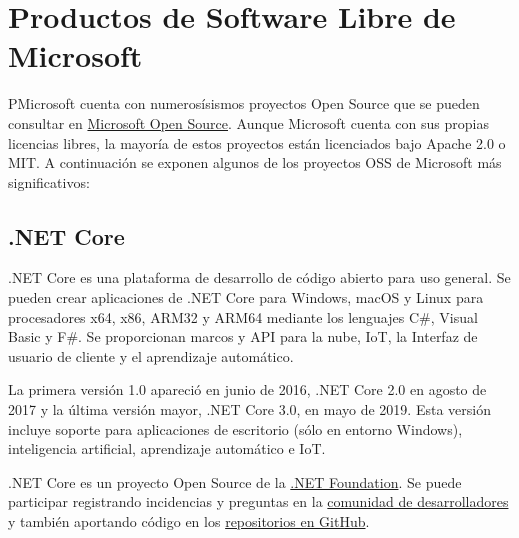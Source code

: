\section{Productos de Software Libre de Microsoft}PMicrosoft cuenta con numerosísismos proyectos Open Source que se pueden consultar en \href{https://opensource.microsoft.com}{Microsoft Open Source}. Aunque Microsoft cuenta con sus propias licencias libres, la mayoría de estos proyectos están licenciados bajo Apache 2.0 o MIT. A continuación se exponen algunos de los proyectos OSS de Microsoft más significativos:

\subsection{.NET Core}
.NET Core es una plataforma de desarrollo de código abierto para uso general. Se pueden crear aplicaciones de .NET Core para Windows, macOS y Linux para procesadores x64, x86, ARM32 y ARM64 mediante los lenguajes C\#, Visual Basic y F\#. Se proporcionan marcos y API para la nube, IoT, la Interfaz de usuario de cliente y el aprendizaje automático.

La primera versión 1.0 apareció en junio de 2016, .NET Core 2.0 en agosto de 2017 y la última versión mayor, .NET Core 3.0, en mayo de 2019. Esta versión incluye soporte para aplicaciones de escritorio (sólo en entorno Windows), inteligencia artificial, aprendizaje automático e IoT.

.NET Core es un proyecto Open Source de la \href{https://dotnetfoundation.org/}{.NET Foundation}. Se puede participar registrando incidencias y preguntas en la \href{https://developercommunity.visualstudio.com/spaces/61/index.html}{comunidad de desarrolladores} y también aportando código en los \href{https://github.com/dotnet/core/blob/master/Documentation/core-repos.md}{repositorios en GitHub}.

